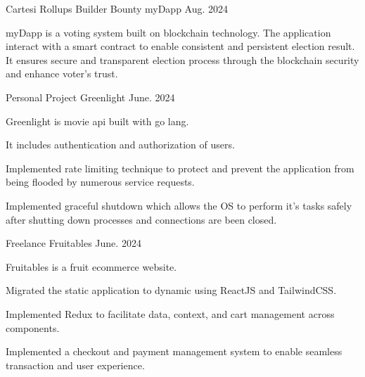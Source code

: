 
\begin{cventries}

  \cventry
  {Cartesi Rollups Builder Bounty} %
  {myDapp } %
  {} %
  {Aug. 2024} %
  {
    \begin{cvitems} %
      \item {myDapp is a voting system built on blockchain technology. The
                  application interact with a smart contract to enable
                  consistent and persistent
                  election result. It ensures secure and transparent election
                  process through the
                  blockchain security and enhance voter's trust.}
    \end{cvitems}
  }
  \cventry
  {Personal Project} %
  {Greenlight } %
  {} %
  {June. 2024} %
  {
    \begin{cvitems} %
      \item {Greenlight is movie api built with go lang.}
      \item {It includes authentication and authorization of users.}
      \item {Implemented rate limiting technique to protect and prevent the
                  application from being flooded by numerous service requests.}
      \item {Implemented graceful shutdown which allows the OS to perform it's
                  tasks safely after shutting down processes and connections
                  are been closed.}
    \end{cvitems}
  }

  \cventry
  {Freelance} %
  {Fruitables } %
  {} %
  {June. 2024} %
  {
    \begin{cvitems} %
      \item {Fruitables is a fruit ecommerce website.}
      \item {Migrated the static application to dynamic using ReactJS and
                  TailwindCSS.}
      \item {Implemented Redux to facilitate data, context, and cart
                  management across components.}
      \item {Implemented a checkout and payment management system to enable
                  seamless transaction and user experience.}


\end{cvitems}}
\end{cventries}
